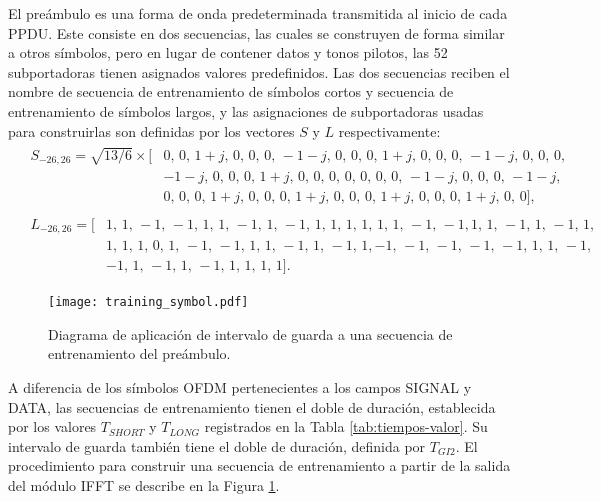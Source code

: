 El preámbulo es una forma de onda predeterminada transmitida al inicio de cada PPDU. Este consiste en dos secuencias, las cuales se construyen de forma similar a otros símbolos, pero en lugar de contener datos y tonos pilotos, las 52 subportadoras \color{Red} tienen asignados \color{black} valores predefinidos. Las dos secuencias reciben el nombre de secuencia de entrenamiento de símbolos cortos y secuencia de entrenamiento de símbolos largos, y las asignaciones de subportadoras usadas para construirlas son definidas por los vectores $S$ y $L$ respectivamente:
\begin{align}
    &\begin{aligned}
        S_{-26,26} = \sqrt{13/6}\times 
        [&0 ,\,  0   ,\, 1+j ,\,  0   ,\, 0 ,\,  0   ,\, -1-j ,\,  0   ,\, 0 ,\, 0   ,\, 1+j ,\, 0   ,\, 0 ,\, 
         0 ,\, -1-j ,\, 0   ,\,  0   ,\, 0 ,\\ 
         &-1-j ,\,  0   ,\,  0   ,\, 0 ,\, 1+j ,\, 0   ,\, 0   ,\, 0 ,\, 0 ,\,
         0 ,\,  0   ,\, 0   ,\, -1-j ,\, 0 ,\,  0   ,\,  0   ,\, -1-j ,\\ 
         &0 ,\, 0   ,\, 0   ,\, 1+j ,\, 0 ,\, 
         0 ,\,  0   ,\, 1+j ,\,  0   ,\, 0 ,\,  0   ,\,  1+j ,\,  0   ,\, 0 ,\, 0   ,\, 1+j ,\, 0   ,\, 0],
    \end{aligned}\label{eq:def-S}\\
    &
    \begin{aligned}
        L_{-26,26} = 
        [&1,\, 1,\, -1,\, -1,\, 1,\, 1,\, -1,\, 1,\, -1,\, 1,\, 1,\, 1,\, 1,\, 1,\, 1,\, -1,\, -1, 1,\, 1,\, -1,\, 1,\, -1,\, 1,\\& 1,\, 1,\, 1,\, 
        0,\,
        1,\, -1,\, -1,\, 1,\, 1,\, -1,\, 1,\, -1,\, 1, -1,\, -1,\, -1,\, -1,\, -1,\, 1,\, 1,\, -1,\\& -1,\, 1,\, -1,\, 1,\, -1,\, 1,\, 1,\, 1,\, 1].
    \end{aligned}\label{eq:def-L}
\end{align}
\begin{figure}[t]
    \centering{}\texttt{[image: training\_symbol.pdf]}
    \caption{Diagrama de aplicación de intervalo de guarda a una secuencia de entrenamiento del preámbulo.\label{fig:training-symbol}}  
\end{figure}

A diferencia de los símbolos OFDM pertenecientes a los campos SIGNAL y DATA, las secuencias de entrenamiento tienen el doble de duración, establecida por los valores $T_{SHORT}$ y $T_{LONG}$ registrados en la Tabla \ref{tab:tiempos-valor}. Su intervalo de guarda también tiene el doble de duración, definida por $T_{GI2}$. El procedimiento para construir una secuencia de entrenamiento a partir de la salida del módulo IFFT se describe en la Figura \ref{fig:training-symbol}.

